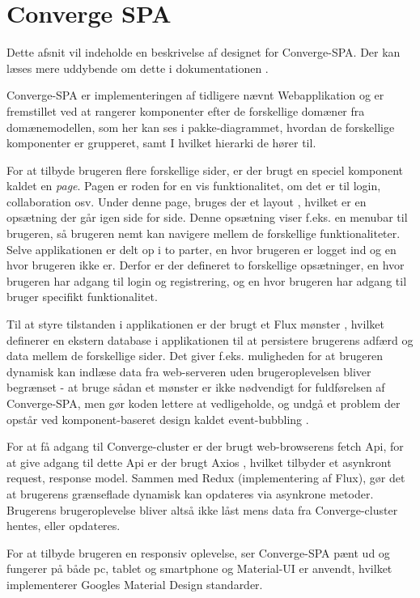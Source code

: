 \section{Converge SPA}

Dette afsnit vil indeholde en beskrivelse af designet for Converge-SPA. Der kan læses mere uddybende om dette i dokumentationen \cite[Converge-SPA]{software-design}.

Converge-SPA er implementeringen af tidligere nævnt Webapplikation og er fremstillet ved at rangerer komponenter efter de forskellige domæner fra domænemodellen, som her kan ses i pakke-diagrammet, hvordan de forskellige komponenter er grupperet, samt I hvilket hierarki de hører til.

For at tilbyde brugeren flere forskellige sider, er der brugt en speciel komponent kaldet en \emph{page}. Pagen er roden for en vis 
funktionalitet, om det er til login, collaboration osv. Under denne page, bruges der et layout \cite[Layout]{converge-terms}, hvilket er en opsætning der går igen side for side. Denne opsætning viser f.eks. en menubar til brugeren, så brugeren nemt kan navigere mellem de forskellige funktionaliteter. Selve applikationen er delt op i to parter, en hvor brugeren er logget ind og en hvor brugeren ikke er. Derfor er der defineret to forskellige opsætninger, en hvor brugeren har adgang til login og registrering, og en hvor brugeren har adgang til bruger specifikt funktionalitet.

Til at styre tilstanden i applikationen er der brugt et Flux mønster \cite{Flux-pattern}, hvilket definerer en ekstern database i applikationen til at persistere brugerens adfærd og data mellem de forskellige sider. Det giver f.eks. muligheden for at brugeren dynamisk kan indlæse data fra web-serveren uden brugeroplevelsen bliver begrænset - at bruge sådan et mønster er ikke nødvendigt for fuldførelsen af Converge-SPA, men gør koden lettere at vedligeholde, og undgå et problem der opstår ved komponent-baseret design kaldet event-bubbling \cite[Event-bubbling]{converge-terms}.

For at få adgang til Converge-cluster er der brugt web-browserens fetch Api, for at give adgang til dette Api er der brugt Axios \cite{Axios}, hvilket tilbyder et asynkront request, response model. Sammen med Redux (implementering af Flux), gør det at brugerens grænseflade dynamisk kan opdateres via asynkrone metoder. Brugerens brugeroplevelse bliver altså ikke låst mens data fra Converge-cluster hentes, eller opdateres.

For at tilbyde brugeren en responsiv oplevelse, ser Converge-SPA pænt ud og fungerer på både pc, tablet og smartphone og Material-UI \cite[Material-UI]{converge-terms} er anvendt, hvilket implementerer Googles Material Design standarder.
